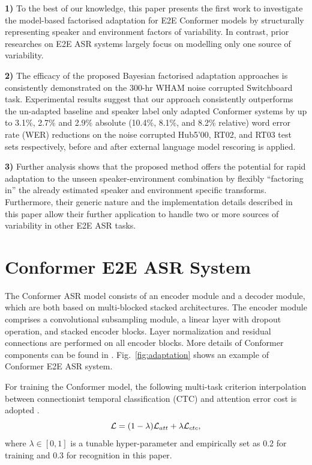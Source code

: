 \documentclass{INTERSPEECH2023}
\begin{document}
{\bf 1)} To the best of our knowledge, this paper presents the first work to investigate the model-based factorised adaptation for E2E Conformer models by structurally representing speaker and environment factors of variability. In contrast, prior researches on E2E ASR systems largely focus on modelling only one source of variability\cite{zhao2020speech,tuske2021limit,huang2021rapid,zeineldeen2022conformer,zeineldeen2022improving,deng2023confidence,chang2020end,zhang2021end,kumar2022end,sukhadia2023domain}. 

{\bf 2)} The efficacy of the proposed Bayesian factorised adaptation approaches is consistently demonstrated on the 300-hr WHAM noise corrupted Switchboard task. Experimental results suggest that our approach consistently outperforms the un-adapted baseline and speaker label only adapted Conformer systems by up to 3.1\%, 2.7\% and 2.9\% absolute (10.4\%, 8.1\%, and 8.2\% relative) word error rate (WER) reductions on the noise corrupted Hub5’00, RT02, and RT03 test sets respectively, before and after external language model rescoring is applied.

{\bf 3)} Further analysis shows that the proposed method offers the potential for rapid adaptation to the unseen speaker-environment combination by flexibly “factoring in” the already estimated speaker and environment specific transforms. Furthermore, their generic nature and the implementation details described in this paper allow their further application to handle two or more sources of variability in other E2E ASR tasks.

\section{Conformer E2E ASR System}
The Conformer \cite{guo2021recent} ASR model consists of an encoder module and a decoder module, which are both based on multi-blocked stacked architectures. The  encoder module comprises a convolutional subsampling module, a linear layer with dropout operation, and stacked encoder blocks. Layer normalization and residual connections are performed on all encoder blocks. More details of Conformer components can be found in \cite{gulati2020conformer}. Fig.~\ref{fig:adaptation} shows an example of Conformer E2E ASR system.

For training the Conformer model, the following multi-task criterion interpolation between connectionist temporal classification (CTC) and attention error cost is adopted \cite{watanabe2017hybrid}.
\begin{equation}
{\cal{L}}=(1-\lambda) {{\cal{L}}_{att}} + \lambda{{\cal{L}}_{ctc}},
\label{enq:loss_combine}
\end{equation}
where $\lambda \in [0, 1]$ is a tunable hyper-parameter and empirically set as 0.2 for training and 0.3 for recognition in this paper.
\end{document}
